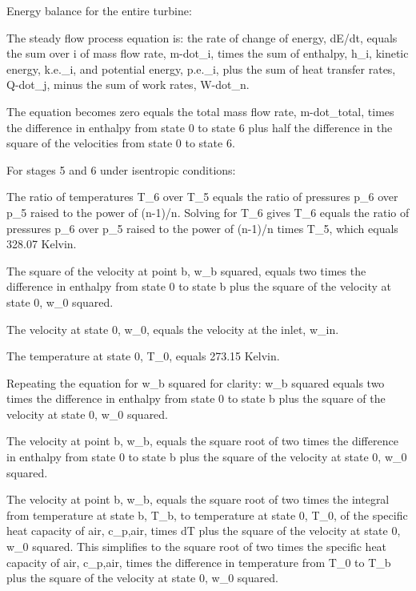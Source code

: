 Energy balance for the entire turbine:

The steady flow process equation is: the rate of change of energy, dE/dt, equals the sum over i of mass flow rate, m-dot_i, times the sum of enthalpy, h_i, kinetic energy, k.e._i, and potential energy, p.e._i, plus the sum of heat transfer rates, Q-dot_j, minus the sum of work rates, W-dot_n.

The equation becomes zero equals the total mass flow rate, m-dot_total, times the difference in enthalpy from state 0 to state 6 plus half the difference in the square of the velocities from state 0 to state 6.

For stages 5 and 6 under isentropic conditions:

The ratio of temperatures T_6 over T_5 equals the ratio of pressures p_6 over p_5 raised to the power of (n-1)/n. Solving for T_6 gives T_6 equals the ratio of pressures p_6 over p_5 raised to the power of (n-1)/n times T_5, which equals 328.07 Kelvin.

The square of the velocity at point b, w_b squared, equals two times the difference in enthalpy from state 0 to state b plus the square of the velocity at state 0, w_0 squared.

The velocity at state 0, w_0, equals the velocity at the inlet, w_in.

The temperature at state 0, T_0, equals 273.15 Kelvin.

Repeating the equation for w_b squared for clarity: w_b squared equals two times the difference in enthalpy from state 0 to state b plus the square of the velocity at state 0, w_0 squared.

The velocity at point b, w_b, equals the square root of two times the difference in enthalpy from state 0 to state b plus the square of the velocity at state 0, w_0 squared.

The velocity at point b, w_b, equals the square root of two times the integral from temperature at state b, T_b, to temperature at state 0, T_0, of the specific heat capacity of air, c_p,air, times dT plus the square of the velocity at state 0, w_0 squared. This simplifies to the square root of two times the specific heat capacity of air, c_p,air, times the difference in temperature from T_0 to T_b plus the square of the velocity at state 0, w_0 squared.